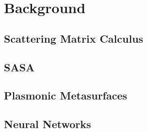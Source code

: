 \section{Background} \label{sec:background}

\subsection{Scattering Matrix Calculus} \label{sec:s_mats}

\clearpage

\subsection{SASA}\label{sec:SASA}

\clearpage

\subsection{Plasmonic Metasurfaces}\label{sec:plasmonic}

\clearpage

\subsection{Neural Networks} \label{sec:NN_bg}

